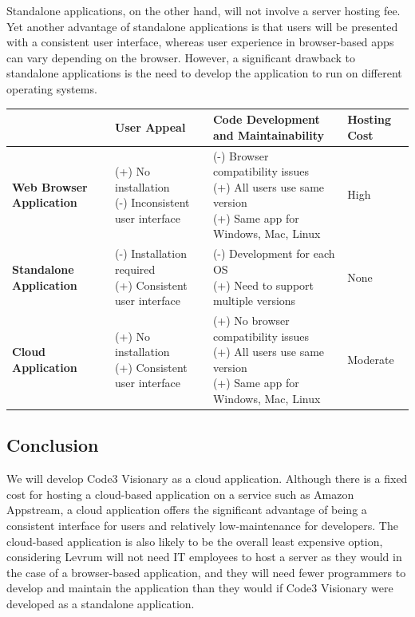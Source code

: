\documentclass[onecolumn, draftclsnofoot,10pt, compsoc]{IEEEtran}
\begin{document}
    Standalone applications, on the other hand, will not involve a server hosting fee. Yet another advantage of standalone applications is that users will be presented with a consistent user interface, whereas user experience in browser-based apps can vary depending on the browser. However, a significant drawback to standalone applications is the need to develop the application to run on different operating systems.
        \begin{center}
        \begin{tabular}{ |l|l|l|l|  } 
        \hline
        & \textbf{User Appeal}
        & \shortstack[l]{\textbf{Code Development} \\ 
        \textbf{and Maintainability}}
        & \textbf{Hosting Cost} \\
        \hline
        \textbf{Web Browser Application}
        & \shortstack[l]{(+) No installation \\
         (-) Inconsistent user interface}
        & \shortstack[l]{(-) Browser compatibility issues\\
         (+) All users use same version\\
         (+) Same app for Windows, Mac, Linux}
        & High \\
        \hline
        \textbf{Standalone Application}
        & \shortstack[l]{(-) Installation required \\
         (+) Consistent user interface}
        & \shortstack[l]{(-) Development for each OS \\
         (+) Need to support multiple versions}
        & None \\
        \hline
        \textbf{Cloud Application}
        & \shortstack[l]{(+) No installation \\
         (+) Consistent user interface}
        & \shortstack[l]{(+) No browser compatibility issues\\
         (+) All users use same version\\
         (+) Same app for Windows, Mac, Linux}
        &  Moderate \\
        \hline
        \end{tabular}
        \end{center}
    
    \subsection{Conclusion}
    We will develop Code3 Visionary as a cloud application. 
    Although there is a fixed cost for hosting a cloud-based application on a service such as Amazon Appstream, a cloud application offers the significant advantage of being a consistent interface for users and relatively low-maintenance for developers. 
    The cloud-based application is also likely to be the overall least expensive option, considering Levrum will not need IT employees to host a server as they would in the case of a browser-based application, and they will need fewer programmers to develop and maintain the application than they would if Code3 Visionary were developed as a standalone application. 
\newpage    
{}

\end{document}
